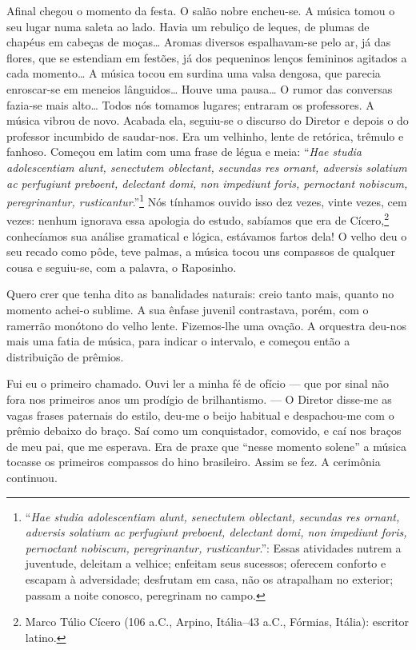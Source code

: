 Afinal chegou o momento da festa. O salão nobre encheu-se. A música
tomou o seu lugar numa saleta ao lado. Havia um rebuliço de leques, de
plumas de chapéus em cabeças de moças\ldots{} Aromas diversos espalhavam-se
pelo ar, já das flores, que se estendiam em festões, já dos pequeninos
lenços femininos agitados a cada momento\ldots{} A música tocou em surdina
uma valsa dengosa, que parecia enroscar-se em meneios lânguidos\ldots{} Houve
uma pausa\ldots{} O rumor das conversas fazia-se mais alto\ldots{} Todos nós
tomamos lugares; entraram os professores. A música vibrou de novo.
Acabada ela, seguiu-se o discurso do Diretor e depois o do professor
incumbido de saudar-nos. Era um velhinho, lente de retórica, trêmulo e
fanhoso. Começou em latim com uma frase de légua e meia: ``\emph{Hae
studia adolescentiam alunt, senectutem oblectant, secundas res ornant,
adversis solatium ac perfugiunt preboent, delectant domi, non impediunt
foris, pernoctant nobiscum, peregrinantur, rusticantur}.''\footnote{``\emph{Hae
  studia adolescentiam alunt, senectutem oblectant, secundas res ornant,
  adversis solatium ac perfugiunt preboent, delectant domi, non
  impediunt foris, pernoctant nobiscum, peregrinantur, rusticantur}.'':
  Essas atividades nutrem a juventude, deleitam a velhice; enfeitam seus
  sucessos; oferecem conforto e escapam à adversidade; desfrutam em
  casa, não os atrapalham no exterior; passam a noite conosco,
  peregrinam no campo.} Nós tínhamos ouvido isso dez vezes, vinte vezes,
cem vezes: nenhum ignorava essa apologia do estudo, sabíamos que era de
Cícero,\footnote{Marco Túlio Cícero (106 a.C., Arpino, Itália--43 a.C.,
  Fórmias, Itália): escritor latino.} conhecíamos sua análise gramatical
e lógica, estávamos fartos dela! O velho deu o seu recado como pôde,
teve palmas, a música tocou uns compassos de qualquer cousa e seguiu-se,
com a palavra, o Raposinho.

Quero crer que tenha dito as banalidades naturais: creio tanto mais,
quanto no momento achei-o sublime. A sua ênfase juvenil contrastava,
porém, com o ramerrão monótono do velho lente. Fizemos-lhe uma ovação. A
orquestra deu-nos mais uma fatia de música, para indicar o intervalo, e
começou então a distribuição de prêmios.

Fui eu o primeiro chamado. Ouvi ler a minha fé de ofício --- que por
sinal não fora nos primeiros anos um prodígio de brilhantismo. --- O
Diretor disse-me as vagas frases paternais do estilo, deu-me o beijo
habitual e despachou-me com o prêmio debaixo do braço. Saí como um
conquistador, comovido, e caí nos braços de meu pai, que me esperava.
Era de praxe que ``nesse momento solene'' a música tocasse os primeiros
compassos do hino brasileiro. Assim se fez. A cerimônia continuou.

